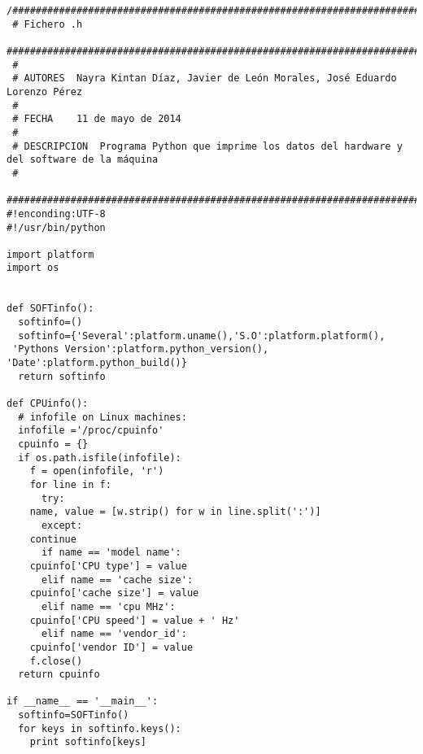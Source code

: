 \begin{center}
\begin{footnotesize}
\begin{verbatim}
/###################################################################################
 # Fichero .h
 ###################################################################################
 #
 # AUTORES  Nayra Kintan Díaz, Javier de León Morales, José Eduardo Lorenzo Pérez
 #
 # FECHA    11 de mayo de 2014
 #
 # DESCRIPCION  Programa Python que imprime los datos del hardware y del software de la máquina
 #
 ##################################################################################
#!enconding:UTF-8
#!/usr/bin/python

import platform
import os


def SOFTinfo():
  softinfo=()
  softinfo={'Several':platform.uname(),'S.O':platform.platform(),
 'Pythons Version':platform.python_version(), 'Date':platform.python_build()}
  return softinfo

def CPUinfo():
  # infofile on Linux machines:
  infofile ='/proc/cpuinfo'
  cpuinfo = {}
  if os.path.isfile(infofile):
    f = open(infofile, 'r')
    for line in f:
      try:
	name, value = [w.strip() for w in line.split(':')]
      except:
	continue
      if name == 'model name':
	cpuinfo['CPU type'] = value
      elif name == 'cache size':
	cpuinfo['cache size'] = value
      elif name == 'cpu MHz':
	cpuinfo['CPU speed'] = value + ' Hz'
      elif name == 'vendor_id':
	cpuinfo['vendor ID'] = value
    f.close()
  return cpuinfo

if __name__ == '__main__':
  softinfo=SOFTinfo()
  for keys in softinfo.keys():
    print softinfo[keys]
\end{verbatim}
\end{footnotesize}
\end{center}
